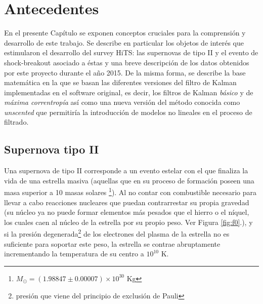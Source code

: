 \chapter{Antecedentes}
\label{ch:background}
En el presente Cap\'itulo se exponen conceptos cruciales para la comprensi\'on y desarrollo de este trabajo. Se describe en particular los objetos de inter\'es que estimularon el desarrollo del survey HiTS: las supernovas de tipo II y el evento de shock-breakout asociado a \'estas y una breve descripci\'on de los datos obtenidos por este proyecto durante el a\~no 2015. De la misma forma, se describe la base matem\'atica en la que se basan las diferentes versiones del filtro de Kalman implementadas en el software original, es decir, los filtros de Kalman \textit{b\'asico} y de \textit{m\'axima correntrop\'ia} as\'i como una nueva versi\'on del m\'etodo conocida como \textit{unscented} que permitir\'ia la introducci\'on de modelos no lineales en el proceso de filtrado.  

\section{Supernova tipo II}\label{sec:sn}
Una supernova de tipo II corresponde a un evento estelar con el que finaliza la vida de una estrella masiva (aquellas que en su proceso de formaci\'on poseen una masa superior a 10 masas solares \footnote{$M_{\odot} = (1.98847 \pm 0.00007) \times 10^{30}$ Kg}). Al no contar con combustible necesario para llevar a cabo reacciones nucleares que puedan contrarrestar su propia gravedad (su n\'ucleo ya no puede formar elementos m\'as pesados que el hierro o el n\'iquel, los cuales caen al n\'ucleo de la estrella por su propio peso. Ver Figura \ref{fig:f0}.), y si la presi\'on degenerada\footnote{presi\'on que viene del principio de exclusi\'on de Pauli} de los electrones del plasma de la estrella no es suficiente para soportar este peso, la estrella se contrae abruptamente incrementando la temperatura de su centro a $10^{10}$ K.
\bigskip

